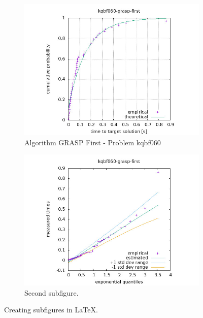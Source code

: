 \begin{figure}[H]
    \centering
    \begin{subfigure}{0.49\textwidth}
        \includegraphics[width=\textwidth]{figure/ttt_plot/kqbf060-grasp-first-exp.jpeg}
        \caption{Algorithm GRASP First - Problem kqbf060}
        \label{fig:grasp-first-kqbf060-exp}
    \end{subfigure}
    \hfill
    \begin{subfigure}{0.49\textwidth}
        \includegraphics[width=\textwidth]{figure/ttt_plot/kqbf060-grasp-first-qq.jpeg}
        \caption{Second subfigure.}
        \label{fig:grasp-first-kqbf060-qq}
    \end{subfigure}
    \caption{Creating subfigures in \LaTeX.}
    \label{fig:grasp-first-kqbf060}
\end{figure}


